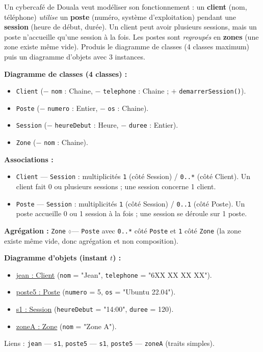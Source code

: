 \documentclass[11pt]{article}
\def\diamond{\mathbin{\scalebox{0.6}{$\Diamond$}}}%
\begin{document}
\begin{exercice}
Un cybercafé de Douala veut modéliser son fonctionnement : un \textbf{client} (nom, téléphone) \emph{utilise} un \textbf{poste} (numéro, système d'exploitation) pendant une \textbf{session} (heure de début, durée). Un client peut avoir plusieurs sessions, mais un poste n'accueille qu'une session à la fois. Les postes sont \emph{regroupés} en \textbf{zones} (une zone existe même vide). Produis le diagramme de classes (4 classes maximum) puis un diagramme d'objets avec 3 instances.
\end{exercice}

\begin{corrige}
\textbf{Diagramme de classes (4 classes) :}
\begin{itemize}
  \item \texttt{Client} ($-$ \texttt{nom} : Chaine, $-$ \texttt{telephone} : Chaine ; $+$ \texttt{demarrerSession()}).
  \item \texttt{Poste} ($-$ \texttt{numero} : Entier, $-$ \texttt{os} : Chaine).
  \item \texttt{Session} ($-$ \texttt{heureDebut} : Heure, $-$ \texttt{duree} : Entier).
  \item \texttt{Zone} ($-$ \texttt{nom} : Chaine).
\end{itemize}
\textbf{Associations :}
\begin{itemize}
  \item \texttt{Client} --- \texttt{Session} : multiplicités \texttt{1} (côté Session) / \texttt{0..*} (côté Client). Un client fait 0 ou plusieurs sessions ; une session concerne 1 client.
  \item \texttt{Poste} --- \texttt{Session} : multiplicités \texttt{1} (côté Session) / \texttt{0..1} (côté Poste). Un poste accueille 0 ou 1 session à la fois ; une session se déroule sur 1 poste.
\end{itemize}
\textbf{Agrégation :} \texttt{Zone} $\diamond$--- \texttt{Poste} avec \texttt{0..*} côté \texttt{Poste} et \texttt{1} côté \texttt{Zone} (la zone existe même vide, donc agrégation et non composition).

\textbf{Diagramme d'objets (instant $t$) :}
\begin{itemize}
  \item \underline{jean : Client} (\texttt{nom} = "Jean", \texttt{telephone} = "6XX XX XX XX").
  \item \underline{poste5 : Poste} (\texttt{numero} = 5, \texttt{os} = "Ubuntu 22.04").
  \item \underline{s1 : Session} (\texttt{heureDebut} = "14:00", \texttt{duree} = 120).
  \item \underline{zoneA : Zone} (\texttt{nom} = "Zone A").
\end{itemize}
Liens : \texttt{jean} --- \texttt{s1}, \texttt{poste5} --- \texttt{s1}, \texttt{poste5} --- \texttt{zoneA} (traits simples).
\end{corrige}
\end{document}
